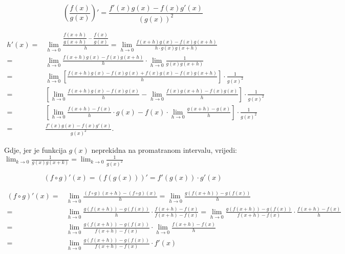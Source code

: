 \pagebreak

\begin{proposition}
    $$
        \left(\frac{f(x)}{g(x)}\right)' = \frac{f'(x)g(x) - f(x)g'(x)}{(g(x))^2}
    $$
\end{proposition}

\begin{align*}
    h'(x) =& \lim_{h\to 0} \frac{\dfrac{f(x+h)}{g(x+h)}-\dfrac{f(x)}{g(x)}}{h} = \lim_{h\to 0} \frac{f(x+h)g(x)-f(x)g(x+h)}{h\cdot g(x)g(x+h)}\\
    =& \lim_{h\to 0} \frac{f(x+h)g(x)-f(x)g(x+h)}{h} \cdot \lim_{h\to 0}\frac{1}{g(x)g(x+h)}\\
    =& \lim_{h\to 0} \left[\frac{f(x+h)g(x) - f(x)g(x) + f(x)g(x) - f(x)g(x+h)}{h} \right] \cdot \frac{1}{g(x)^2} \\
    =& \left[\lim_{h\to 0} \frac{f(x+h)g(x) - f(x)g(x)}{h} - \lim_{h\to 0}\frac{f(x)g(x+h) - f(x)g(x)}{h} \right] \cdot \frac{1}{g(x)^2} \\
    =& \left[\lim_{h\to 0} \frac{f(x+h) - f(x)}{h} \cdot g(x) - f(x) \cdot \lim_{h\to 0}\frac{g(x+h) - g(x)}{h} \right] \cdot \frac{1}{g(x)^2} \\
    =& \frac{f'(x)g(x) - f(x)g'(x)}{g(x)^2}.
\end{align*}

Gdje, jer je funkcija $g(x)$ neprekidna na promatranom intervalu, vrijedi:
$
\displaystyle
\lim_{k\to 0}\frac{1}{g(x)g(x+k)} = \lim_{k\to 0}\frac{1}{g(x)^2}
$

\begin{proposition}
    $$
        (f\circ g)'(x) = (f(g(x)))' = f'(g(x)) \cdot g'(x)
    $$
\end{proposition}

\begin{align*}
    (f \circ g)'(x) =& \lim_{h \to 0} \frac{(f \circ g)(x+h) - (f \circ g)(x)}{h} = \lim_{h \to 0} \frac{g(f(x+h))-g(f(x))}{h}\\
    =& \lim_{h \to 0} \frac{g(f(x+h))-g(f(x))}{h} \cdot \frac{f(x+h)-f(x)}{f(x+h)-f(x)} = \lim_{h \to 0} \frac{g(f(x+h))-g(f(x))}{f(x+h)-f(x)} \cdot \frac{f(x+h)-f(x)}{h}\\
    =& \lim_{h \to 0} \frac{g(f(x+h))-g(f(x))}{f(x+h)-f(x)} \cdot \lim_{h \to 0} \frac{f(x+h)-f(x)}{h}\\
    =& \lim_{h \to 0} \frac{g(f(x+h))-g(f(x))}{f(x+h)-f(x)} \cdot f'(x)\\
\end{align*}

